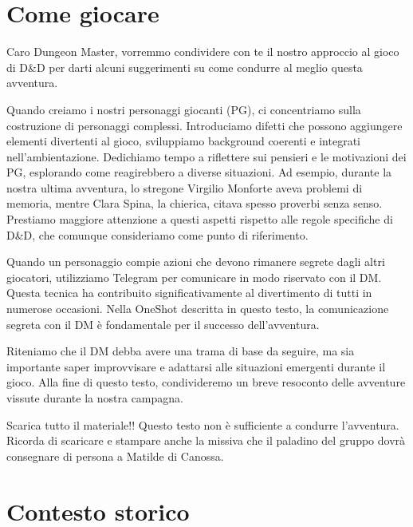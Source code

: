 \documentclass[letterpaper,twocolumn,openany,nodeprecatedcode]{dndbook}
\begin{document}
\section{Come giocare}
Caro Dungeon Master, vorremmo condividere con te il nostro approccio al gioco di D\&D per darti alcuni suggerimenti su come condurre al meglio questa avventura.

Quando creiamo i nostri personaggi giocanti (PG), ci concentriamo sulla costruzione di personaggi complessi. Introduciamo difetti che possono aggiungere elementi divertenti al gioco, sviluppiamo background coerenti e integrati nell'ambientazione. Dedichiamo tempo a riflettere sui pensieri e le motivazioni dei PG, esplorando come reagirebbero a diverse situazioni. Ad esempio, durante la nostra ultima avventura, lo stregone Virgilio Monforte aveva problemi di memoria, mentre Clara Spina, la chierica, citava spesso proverbi senza senso. Prestiamo maggiore attenzione a questi aspetti rispetto alle regole specifiche di D\&D, che comunque consideriamo come punto di riferimento.

Quando un personaggio compie azioni che devono rimanere segrete dagli altri giocatori, utilizziamo Telegram per comunicare in modo riservato con il DM. Questa tecnica ha contribuito significativamente al divertimento di tutti in numerose occasioni. Nella OneShot descritta in questo testo, la comunicazione segreta con il DM è fondamentale per il successo dell'avventura.

Riteniamo che il DM debba avere una trama di base da seguire, ma sia importante saper improvvisare e adattarsi alle situazioni emergenti durante il gioco. Alla fine di questo testo, condivideremo un breve resoconto delle avventure vissute durante la nostra campagna.

\begin{DndSidebar}{Scarica tutto il materiale!!}
Questo testo non è sufficiente a condurre l'avventura. Ricorda di scaricare e stampare anche la missiva che il paladino del gruppo dovrà consegnare di persona a Matilde di Canossa.
\end{DndSidebar}



\section{Contesto storico}
\end{document}
